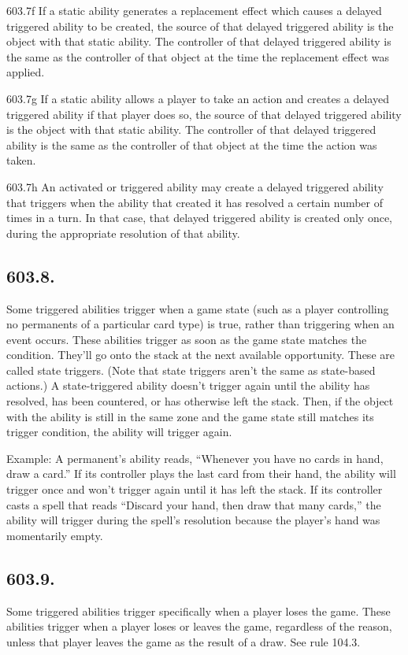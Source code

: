 603.7f If a static ability generates a replacement effect which causes a delayed triggered ability to be created, the source of that delayed triggered ability is the object with that static ability. The controller of that delayed triggered ability is the same as the controller of that object at the time the replacement effect was applied.

603.7g If a static ability allows a player to take an action and creates a delayed triggered ability if that player does so, the source of that delayed triggered ability is the object with that static ability. The controller of that delayed triggered ability is the same as the controller of that object at the time the action was taken.

603.7h An activated or triggered ability may create a delayed triggered ability that triggers when the ability that created it has resolved a certain number of times in a turn. In that case, that delayed triggered ability is created only once, during the appropriate resolution of that ability.

\subsection*{603.8.}
Some triggered abilities trigger when a game state (such as a player controlling no permanents of a particular card type) is true, rather than triggering when an event occurs. These abilities trigger as soon as the game state matches the condition. They’ll go onto the stack at the next available opportunity. These are called state triggers. (Note that state triggers aren’t the same as state-based actions.) A state-triggered ability doesn’t trigger again until the ability has resolved, has been countered, or has otherwise left the stack. Then, if the object with the ability is still in the same zone and the game state still matches its trigger condition, the ability will trigger again.

Example: A permanent’s ability reads, “Whenever you have no cards in hand, draw a card.” If its controller plays the last card from their hand, the ability will trigger once and won’t trigger again until it has left the stack. If its controller casts a spell that reads “Discard your hand, then draw that many cards,” the ability will trigger during the spell’s resolution because the player’s hand was momentarily empty.

\subsection*{603.9.}
Some triggered abilities trigger specifically when a player loses the game. These abilities trigger when a player loses or leaves the game, regardless of the reason, unless that player leaves the game as the result of a draw. See rule 104.3.

